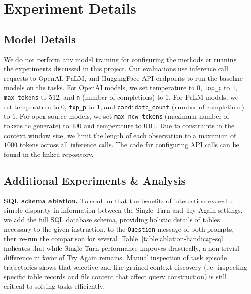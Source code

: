 \section{Experiment Details}
\label{appx:experiments}

\subsection{Model Details}
\label{appx:experiments:details}

We do not perform any model training for configuring the methods or running the experiments discussed in this project. Our evaluations use inference call requests to OpenAI, PaLM, and HuggingFace API endpoints to run the baseline models on the \benchmark{} tasks. For OpenAI models, we set temperature to $0$, \texttt{top\_p} to $1$, \texttt{max\_tokens} to 512, and \texttt{n} (number of completions) to $1$. For PaLM models, we set temperature to $0$, \texttt{top\_p} to $1$, and \texttt{candidate\_count} (number of completions) to $1$. For open source models, we set \texttt{max\_new\_tokens} (maximum number of tokens to generate) to $100$ and temperature to $0.01$. Due to constraints in the context window size, we limit the length of each observation to a maximum of $1000$ tokens across all inference calls. The code for configuring API calls can be found in the linked repository.

\subsection{Additional Experiments \& Analysis}
\label{appx:experiments:additional_expr}



\textbf{SQL schema ablation.} To confirm that the benefits of interaction exceed a simple disparity in information between the Single Turn and Try Again settings, we add the full SQL database schema, providing holistic details of tables necessary to the given instruction, to the \texttt{Question} message of both prompts, then re-run the comparison for several. Table~\ref{table:ablation-handicap-sql} indicates that while Single Turn performance improves drastically, a non-trivial difference in favor of Try Again remains. Manual inspection of task episode trajectories shows that selective and fine-grained context discovery (i.e. inspecting specific table records and file content that affect query construction) is still critical to solving tasks efficiently.



